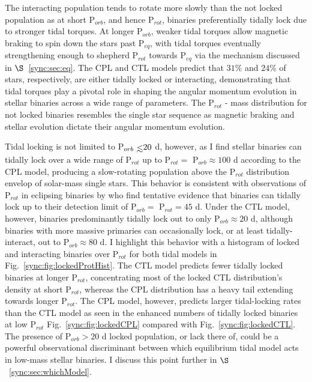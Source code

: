 The interacting population tends to rotate more slowly than the not locked population as at short P$_{orb}$, and hence P$_{rot}$, binaries preferentially tidally lock due to stronger tidal torques.  At longer P$_{orb}$, weaker tidal torques allow magnetic braking to spin down the stars past P$_{eq}$, with tidal torques eventually strengthening enough to shepherd P$_{rot}$ towards P$_{eq}$ via the mechanism discussed in $\S$~\ref{sync:sec:eq}. The CPL and CTL models predict that $31\%$ and $24\%$ of stars, respectively, are either tidally locked or interacting, demonstrating that tidal torques play a pivotal role in shaping the angular momentum evolution in stellar binaries across a wide range of parameters. The P$_{rot}$ - mass distribution for not locked binaries resembles the single star sequence as magnetic braking and stellar evolution dictate their angular momentum evolution.

Tidal locking is not limited to P$_{orb} \lsim 20$ d, however, as I find stellar binaries can tidally lock over a wide range of P$_{rot}$ up to P$_{rot} =$ P$_{orb} \approx 100$ d according to the CPL model, producing a slow-rotating population above the P$_{rot}$ distribution envelop of solar-mass single stars. This behavior is consistent with observations of P$_{rot}$ in \kepler eclipsing binaries by \citet{Lurie2017} who find tentative evidence that binaries can tidally lock up to their detection limit of P$_{orb} = $ P$_{rot} = 45$ d. Under the CTL model, however, binaries predominantly tidally lock out to only P$_{orb} \approx 20$ d, although binaries with more massive primaries can occasionally lock, or at least tidally-interact, out to P$_{orb} \approx 80$ d. I highlight this behavior with a histogram of locked and interacting binaries over P$_{rot}$ for both tidal models in Fig.~\ref{sync:fig:lockedProtHist}. The CTL model predicts fewer tidally locked binaries at longer P$_{rot}$, concentrating most of the locked CTL distribution's density at short P$_{rot}$, whereas the CPL distribution has a heavy tail extending towards longer P$_{rot}$. The CPL model, however, predicts larger tidal-locking rates than the CTL model as seen in the enhanced numbers of tidally locked binaries at low P$_{rot}$ Fig.~\ref{sync:fig:lockedCPL} compared with Fig.~\ref{sync:fig:lockedCTL}. The presence of P$_{orb} > 20$ d locked population, or lack there of, could be a powerful observational discriminant between which equilibrium tidal model acts in low-mass stellar binaries. I discuss this point further in $\S$~\ref{sync:sec:whichModel}. 

